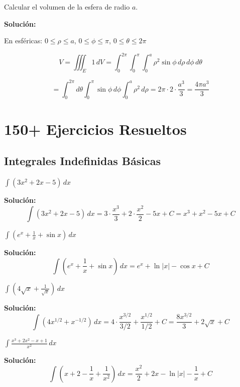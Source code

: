 \documentclass[12pt, a4paper]{book}
\begin{document}
\begin{ejemplo}
Calcular el volumen de la esfera de radio $a$.

\textbf{Solución:}

En esféricas: $0 \leq \rho \leq a$, $0 \leq \phi \leq \pi$, $0 \leq \theta \leq 2\pi$

\[
V = \iiint_E 1 \, dV = \int_0^{2\pi} \int_0^\pi \int_0^a \rho^2\sin\phi \, d\rho \, d\phi \, d\theta
\]

\[
= \int_0^{2\pi} d\theta \int_0^\pi \sin\phi \, d\phi \int_0^a \rho^2 \, d\rho = 2\pi \cdot 2 \cdot \frac{a^3}{3} = \frac{4\pi a^3}{3}
\]
\end{ejemplo}

\chapter{150+ Ejercicios Resueltos}

\section{Integrales Indefinidas Básicas}

\begin{ejercicio}
$\int (3x^2 + 2x - 5) \, dx$
\end{ejercicio}

\textbf{Solución:}
\[
\int (3x^2 + 2x - 5) \, dx = 3 \cdot \frac{x^3}{3} + 2 \cdot \frac{x^2}{2} - 5x + C = x^3 + x^2 - 5x + C
\]

\begin{ejercicio}
$\int (e^x + \frac{1}{x} + \sin x) \, dx$
\end{ejercicio}

\textbf{Solución:}
\[
\int (e^x + \frac{1}{x} + \sin x) \, dx = e^x + \ln|x| - \cos x + C
\]

\begin{ejercicio}
$\int (4\sqrt{x} + \frac{1}{\sqrt{x}}) \, dx$
\end{ejercicio}

\textbf{Solución:}
\[
\int (4x^{1/2} + x^{-1/2}) \, dx = 4 \cdot \frac{x^{3/2}}{3/2} + \frac{x^{1/2}}{1/2} + C = \frac{8x^{3/2}}{3} + 2\sqrt{x} + C
\]

\begin{ejercicio}
$\int \frac{x^3 + 2x^2 - x + 1}{x^2} \, dx$
\end{ejercicio}

\textbf{Solución:}
\[
\int \left(x + 2 - \frac{1}{x} + \frac{1}{x^2}\right) \, dx = \frac{x^2}{2} + 2x - \ln|x| - \frac{1}{x} + C
\]
\end{document}
